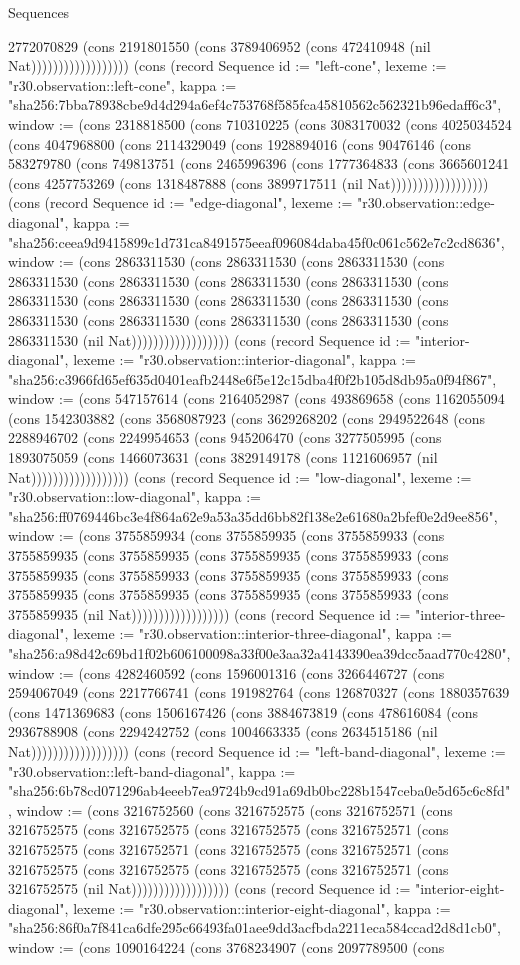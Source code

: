 \begin{lexlean}{Sequences}
\begin{semanticmodule}
{2772070829 (cons 2191801550 (cons 3789406952 (cons 472410948 (nil Nat)))))))))))))))))}) (cons (record Sequence {id := "left-cone", lexeme := "r30.observation::left-cone", kappa := "sha256:7bba78938cbe9d4d294a6ef4c753768f585fca45810562c562321b96edaff6c3", window := (cons 2318818500 (cons 710310225 (cons 3083170032 (cons 4025034524 (cons 4047968800 (cons 2114329049 (cons 1928894016 (cons 90476146 (cons 583279780 (cons 749813751 (cons 2465996396 (cons 1777364833 (cons 3665601241 (cons 4257753269 (cons 1318487888 (cons 3899717511 (nil Nat)))))))))))))))))}) (cons (record Sequence {id := "edge-diagonal", lexeme := "r30.observation::edge-diagonal", kappa := "sha256:ceea9d9415899c1d731ca8491575eeaf096084daba45f0c061c562e7c2cd8636", window := (cons 2863311530 (cons 2863311530 (cons 2863311530 (cons 2863311530 (cons 2863311530 (cons 2863311530 (cons 2863311530 (cons 2863311530 (cons 2863311530 (cons 2863311530 (cons 2863311530 (cons 2863311530 (cons 2863311530 (cons 2863311530 (cons 2863311530 (cons 2863311530 (nil Nat)))))))))))))))))}) (cons (record Sequence {id := "interior-diagonal", lexeme := "r30.observation::interior-diagonal", kappa := "sha256:c3966fd65ef635d0401eafb2448e6f5e12c15dba4f0f2b105d8db95a0f94f867", window := (cons 547157614 (cons 2164052987 (cons 493869658 (cons 1162055094 (cons 1542303882 (cons 3568087923 (cons 3629268202 (cons 2949522648 (cons 2288946702 (cons 2249954653 (cons 945206470 (cons 3277505995 (cons 1893075059 (cons 1466073631 (cons 3829149178 (cons 1121606957 (nil Nat)))))))))))))))))}) (cons (record Sequence {id := "low-diagonal", lexeme := "r30.observation::low-diagonal", kappa := "sha256:ff0769446bc3e4f864a62e9a53a35dd6bb82f138e2e61680a2bfef0e2d9ee856", window := (cons 3755859934 (cons 3755859935 (cons 3755859933 (cons 3755859935 (cons 3755859935 (cons 3755859935 (cons 3755859933 (cons 3755859935 (cons 3755859933 (cons 3755859935 (cons 3755859933 (cons 3755859935 (cons 3755859935 (cons 3755859935 (cons 3755859933 (cons 3755859935 (nil Nat)))))))))))))))))}) (cons (record Sequence {id := "interior-three-diagonal", lexeme := "r30.observation::interior-three-diagonal", kappa := "sha256:a98d42c69bd1f02b606100098a33f00e3aa32a4143390ea39dcc5aad770c4280", window := (cons 4282460592 (cons 1596001316 (cons 3266446727 (cons 2594067049 (cons 2217766741 (cons 191982764 (cons 126870327 (cons 1880357639 (cons 1471369683 (cons 1506167426 (cons 3884673819 (cons 478616084 (cons 2936788908 (cons 2294242752 (cons 1004663335 (cons 2634515186 (nil Nat)))))))))))))))))}) (cons (record Sequence {id := "left-band-diagonal", lexeme := "r30.observation::left-band-diagonal", kappa := "sha256:6b78cd071296ab4eeeb7ea9724b9cd91a69db0bc228b1547ceba0e5d65c6c8fd", window := (cons 3216752560 (cons 3216752575 (cons 3216752571 (cons 3216752575 (cons 3216752575 (cons 3216752575 (cons 3216752571 (cons 3216752575 (cons 3216752571 (cons 3216752575 (cons 3216752571 (cons 3216752575 (cons 3216752575 (cons 3216752575 (cons 3216752571 (cons 3216752575 (nil Nat)))))))))))))))))}) (cons (record Sequence {id := "interior-eight-diagonal", lexeme := "r30.observation::interior-eight-diagonal", kappa := "sha256:86f0a7f841ca6dfe295c66493fa01aee9dd3acfbda2211eca584ccad2d8d1cb0", window := (cons 1090164224 (cons 3768234907 (cons 2097789500 (cons }
\end{semanticmodule}
\end{lexlean}

